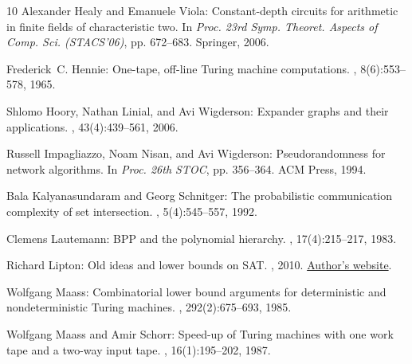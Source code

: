 \begin{thebibliography}{10}
{\sc Alexander Healy and Emanuele Viola}: Constant-depth circuits for
  arithmetic in finite fields of characteristic two.
\newblock In {\em Proc. 23rd Symp. Theoret. Aspects of Comp. Sci. (STACS'06)},
  pp. 672--683. Springer, 2006.
\newblock [\epfmtdoi{10.1007/11672142\_55}]

{\sc Frederick~C. Hennie}: One-tape, off-line {T}uring machine computations.
, 8(6):553--578, 1965.
\newblock [\epfmtdoi{10.1016/S0019-9958(65)90399-2}]

{\sc Shlomo Hoory, Nathan Linial, and Avi Wigderson}: Expander graphs and their
  applications.
, 43(4):439--561, 2006.
\newblock [\epfmtdoi{10.1090/S0273-0979-06-01126-8}]

{\sc Russell Impagliazzo, Noam Nisan, and Avi Wigderson}: Pseudorandomness for
  network algorithms.
\newblock In {\em Proc. 26th STOC}, pp. 356--364. ACM Press, 1994.
\newblock [\epfmtdoi{10.1145/195058.195190}]

{\sc Bala Kalyanasundaram and Georg Schnitger}: The probabilistic communication
  complexity of set intersection.
, 5(4):545--557, 1992.
\newblock [\epfmtdoi{10.1137/0405044}]

{\sc Clemens Lautemann}: B{PP} and the polynomial hierarchy.
, 17(4):215--217, 1983.
\newblock [\epfmtdoi{10.1016/0020-0190(83)90044-3}]

{\sc Richard Lipton}: Old ideas and lower bounds on {SAT}.
, 2010.
\newblock
  \href{https://rjlipton.wordpress.com/2010/09/02/old-ideas-and-lower-bounds-on-sat}{Author's
  website}.

{\sc Wolfgang Maass}: Combinatorial lower bound arguments for deterministic and
  nondeterministic {T}uring machines.
, 292(2):675--693, 1985.
\newblock [\epfmtdoi{10.2307/2000238}]

{\sc Wolfgang Maass and Amir Schorr}: Speed-up of {T}uring machines with one
  work tape and a two-way input tape.
, 16(1):195--202, 1987.
\newblock [\epfmtdoi{10.1137/0216016}]


\end{thebibliography}
